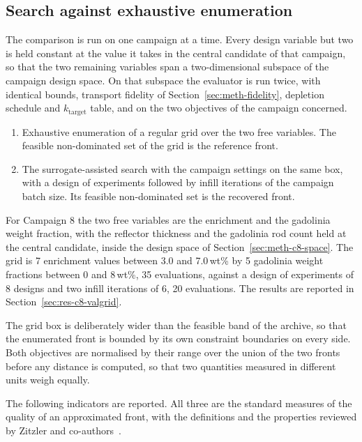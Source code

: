 \subsection{Search against exhaustive enumeration}
\label{sec:validation-grid}

The comparison is run on one campaign at a time. Every design
variable but two is held constant at the value it takes in the central
candidate of that campaign, so that the two remaining variables span a
two-dimensional subspace of the campaign design space. On that subspace
the evaluator is run twice, with identical bounds, transport fidelity
of Section~\ref{sec:meth-fidelity}, depletion schedule and
$k_{\mathrm{target}}$ table, and on the two objectives of the campaign
concerned.

\begin{enumerate}
  \item Exhaustive enumeration of a regular grid over the two free
        variables. The feasible non-dominated set of the grid is the
        reference front.
  \item The surrogate-assisted search with the campaign settings on the
        same box, with a design of experiments followed by infill
        iterations of the campaign batch size. Its feasible
        non-dominated set is the recovered front.
\end{enumerate}

For Campaign 8 the two free variables are the enrichment and the
gadolinia weight fraction, with the reflector thickness and the
gadolinia rod count held at the central candidate, inside the design
space of Section~\ref{sec:meth-c8-space}. The grid is 7 enrichment
values between 3.0 and 7.0\,wt\% by 5 gadolinia weight fractions
between 0 and 8\,wt\%, 35 evaluations, against a design of experiments
of 8 designs and two infill iterations of 6, 20 evaluations. The
results are reported in Section~\ref{sec:res-c8-valgrid}.

The grid box is deliberately wider than the feasible band of the
archive, so that the enumerated front is bounded by its own constraint
boundaries on every side. Both objectives are normalised by their range
over the union of the two fronts before any distance is computed, so
that two quantities measured in different units weigh equally.

The following indicators are reported. All three are the standard
measures of the quality of an approximated front, with the definitions
and the properties reviewed by Zitzler and
co-authors~\cite{zitzler_2003_performance}.

